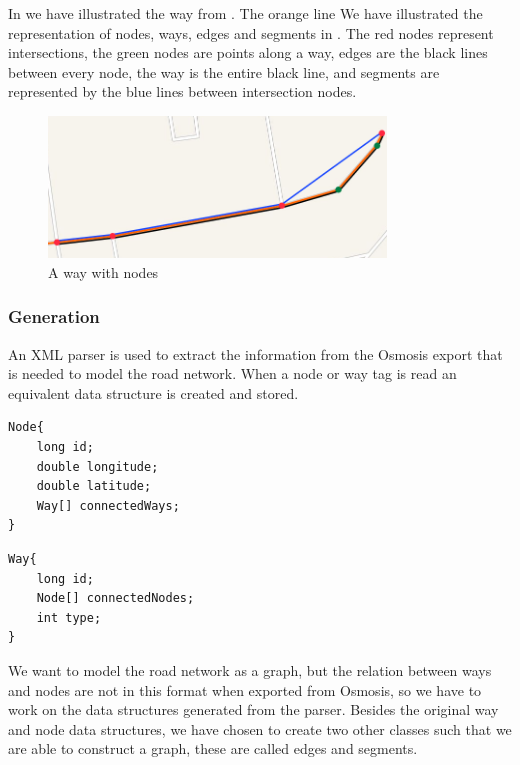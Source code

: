 In  we have illustrated the way from . The orange line 
We have illustrated the representation of nodes, ways, edges and segments in . The red nodes represent intersections, the green nodes are points along a way, edges are the black lines between every node, the way is the entire black line, and segments are represented by the blue lines between intersection nodes.

\begin{figure}[h!]
  \centering
    \includegraphics[width=0.8\textwidth]{figures/way-w-nodes2.png}
    \caption{A way with nodes}
    \label{fig:waywithnodes}
\end{figure}

\subsubsection{Generation}
An XML parser is used to extract the information from the Osmosis export that is needed to model the road network. When a node or way tag is read an equivalent data structure is created and stored.

\begin{lstlisting}[style=java, caption=Datastructure for a node]
Node{
	long id;
	double longitude;
	double latitude;
	Way[] connectedWays;
}
\end{lstlisting}

\begin{lstlisting}[style=java, caption=Datastructure for a way]
Way{
	long id;
	Node[] connectedNodes;
	int type;
}
\end{lstlisting}

We want to model the road network as a graph, but the relation between ways and nodes are not in this format when exported from Osmosis, so we have to work on the data structures generated from the parser.
Besides the original way and node data structures, we have chosen to create two other classes such that we are able to construct a graph, these are called edges and segments.

